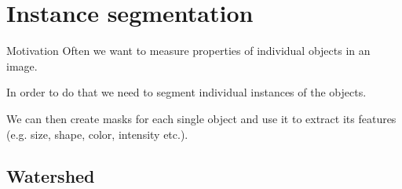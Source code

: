 \documentclass[9pt, aspectratio=169]{beamer}
\begin{document}



\section{Instance segmentation}
\begin{frame}
    {Motivation}
    Often we want to measure properties of individual objects in an image.

    In order to do that we need to segment individual instances of the objects.

    We can then create masks for each single object and use it to extract its features (e.g. size, shape, color, intensity etc.).
\end{frame}

\subsection{Watershed}
\end{document}
